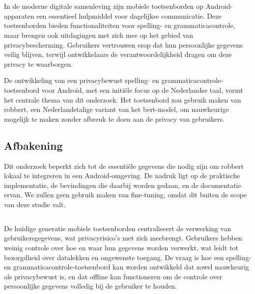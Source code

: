 
\chapter{}%
\label{ch:inleiding}

In de moderne digitale samenleving zijn mobiele toetsenborden op Android-app\-ara\-ten een essentieel hulpmiddel voor dagelijkse communicatie. Deze toetsenborden bieden functionaliteiten voor spelling- en grammaticacontrole, maar brengen ook uitdagingen met zich mee op het gebied van privacybescherming. Gebruikers vertrouwen erop dat hun persoonlijke gegevens veilig blijven, terwijl ontwikkelaars de verantwoordelijkheid dragen om deze privacy te waarborgen.

De ontwikkeling van een privacybewust spelling- en grammaticacontrole-toet\-sen\-bord voor Android, met een initiële focus op de Nederlandse taal, vormt het centrale thema van dit onderzoek. Het toetsenbord zou gebruik maken van \gls{robbert}, een Nederlandstalige variant van het \gls{bert}-model, om nauwkeurige  mogelijk te maken zonder afbreuk te doen aan de privacy van gebruikers.

\section{Afbakening}

Dit onderzoek beperkt zich tot de essentiële gegevens die nodig zijn om \gls{robbert} lokaal te integreren in een Android-omgeving. De nadruk ligt op de praktische implementatie, de bevindingen die daarbij worden gedaan, en de documentatie ervan. We zullen geen gebruik maken van \gls{fine-tuning}, omdat dit buiten de scope van deze studie valt.

\section{}%
\label{sec:probleemstelling}

De huidige generatie mobiele toetsenborden centraliseert de verwerking van gebruikersgegevens, wat privacyrisico's met zich meebrengt. Gebruikers hebben weinig controle over hoe en waar hun gegevens worden verwerkt, wat leidt tot bezorgdheid over datalekken en ongewenste toegang. De vraag is hoe een spelling- en grammaticacontrole-toetsenbord kan worden ontwikkeld dat zowel nauwkeurig als privacybewust is, en dat offline kan functioneren om de controle over persoonlijke gegevens volledig bij de gebruiker te houden.


